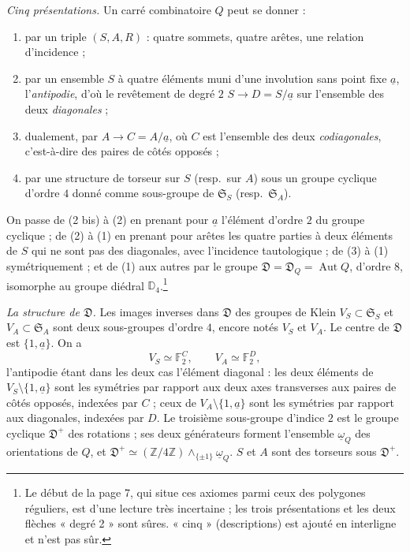 \documentclass[11pt,a4paper]{article}
\begin{document}
\emph{Cinq présentations.} Un carré combinatoire $Q$ peut se donner :
\begin{enumerate}
\item[(1)] par un triple $(S, A, R)$ : quatre sommets, quatre arêtes, une
relation d'incidence ;
\item[(2)] par un ensemble $S$ à quatre éléments muni d'une involution sans
point fixe $\underline{a}$, l'\emph{antipodie}, d'où le revêtement de degré $2$
$S \to D = S/\underline{a}$ sur l'ensemble des deux \emph{diagonales} ;
\item[(3)] dualement, par $A \to C = A/\underline{a}$, où $C$ est l'ensemble des
deux \emph{codiagonales}, c'est-à-dire des paires de côtés opposés ;
\item[(2 bis), (3 bis)] par une structure de torseur sur $S$ (resp.\ sur $A$)
sous un groupe cyclique d'ordre $4$ donné comme sous-groupe de
$\mathfrak{S}_S$ (resp.\ $\mathfrak{S}_A$).
\end{enumerate}
On passe de (2 bis) à (2) en prenant pour $\underline{a}$ l'élément d'ordre $2$
du groupe cyclique ; de (2) à (1) en prenant pour arêtes les quatre parties à
deux éléments de $S$ qui ne sont pas des diagonales, avec l'incidence
tautologique ; de (3) à (1) symétriquement ; et de (1) aux autres par le
groupe $\mathfrak{D} = \mathfrak{D}_Q = \operatorname{Aut} Q$, d'ordre $8$,
isomorphe au groupe diédral $\mathbb{D}_4$.\footnote{Le début de la page 7, qui
situe ces axiomes parmi ceux des polygones réguliers, est d'une lecture très
incertaine ; les trois présentations et les deux flèches « degré 2 » sont
sûres. « cinq » (descriptions) est ajouté en interligne et n'est pas sûr.}

\emph{La structure de $\mathfrak{D}$.} Les images inverses dans $\mathfrak{D}$
des groupes de Klein $V_S \subset \mathfrak{S}_S$ et $V_A \subset \mathfrak{S}_A$
sont deux sous-groupes d'ordre $4$, encore notés $V_S$ et $V_A$. Le centre de
$\mathfrak{D}$ est $\{1, \underline{a}\}$. On a
\[
V_S \simeq \mathbb{F}_2^{C}, \qquad V_A \simeq \mathbb{F}_2^{D},
\]
l'antipodie étant dans les deux cas l'élément diagonal : les deux éléments de
$V_S \setminus \{1, \underline{a}\}$ sont les symétries par rapport aux deux
axes transverses aux paires de côtés opposés, indexées par $C$ ; ceux de
$V_A \setminus \{1, \underline{a}\}$ sont les symétries par rapport aux
diagonales, indexées par $D$. Le troisième sous-groupe d'indice $2$ est le
groupe cyclique $\mathfrak{D}^{+}$ des rotations ; ses deux générateurs forment
l'ensemble $\underline{\omega}_Q$ des orientations de $Q$, et
$\mathfrak{D}^{+} \simeq (\mathbb{Z}/4\mathbb{Z}) \wedge_{\{\pm 1\}}
\underline{\omega}_Q$. $S$ et $A$ sont des torseurs sous $\mathfrak{D}^{+}$.
\end{document}
